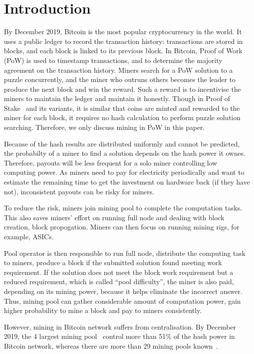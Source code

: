 \section{Introduction}

By December 2019, Bitcoin is the most popular cryptocurrency in the world.
It uses a public ledger to record the transaction history: transactions are stored in blocks, and each block is linked to its previous block.
In Bitcoin, Proof of Work (PoW) is used to timestamp transactions, and to determine the majority agreement on the transaction history.
Miners search for a PoW solution to a puzzle concurrently, and the miner who outruns others becomes the leader to produce the next block and win the reward.
Such a reward is to incentivise the miners to maintain the ledger and maintain it honestly.
Though in Proof of Stake~\cite{} and its variants, it is similar that coins are minted and rewarded to the miner for each block, it requires no hash calculation to perform puzzle solution searching.
Therefore, we only discuss mining in PoW in this paper.

Because of the hash results are distributed uniformly and cannot be predicted, the probabilty of a miner to find a solution depends on the hash power it ownes.
Therefore, payouts will be less frequent for a solo miner controlling low computing power.
As miners need to pay for electricity periodically and want to estimate the remaining time to get the investment on hardware back (if they have not), inconsistent payouts can be risky for miners.

To reduce the risk, miners join mining pool to complete the computation tasks.
This also saves miners' effort on running full node and dealing with block creation, block propogation. 
Miners can then focus on running mining rigs, for example, ASICs.

Pool operator is then responsible to run full node, distribute the computing task to miners, 
produce a block if the submitted solution found meeting work requirement.
If the solution does not meet the block work requirement but a reduced requirement, which is called ``pool difficulty'', the miner is also paid, depending on its mining power, because it helps eliminate the incorrect answer.
Thus, mining pool can gather considerable amount of computation power, gain higher probability to mine a block and pay to miners consistently.

However, mining in Bitcoin network suffers from centralisation.
By December 2019, the 4 largest mining pool~\cite{} control more than 51\% of the hash power in Bitcoin network, whereas there are more than 29 mining pools known~\cite{}.

